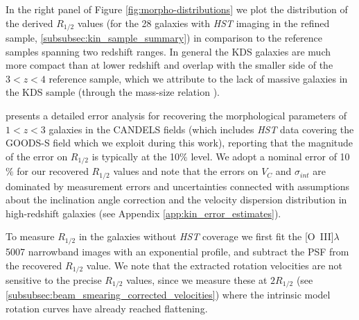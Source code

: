 \documentclass[fleqn,usenatbib]{mn2e}
\begin{document}
In the right panel of Figure \ref{fig:morpho-distributions} we plot the distribution of the derived $R_{1/2}$ values (for the 28 galaxies with {\em HST} imaging in the refined sample, \cref{subsubsec:kin_sample_summary}) in comparison to the reference samples spanning two redshift ranges.
In general the KDS galaxies are much more compact than at lower redshift and overlap with the smaller side of the $3 < z < 4$ reference sample, which we attribute to the lack of massive galaxies in the KDS sample (through the mass-size relation \citep[e.g.][]{Trujillo2004}).

\cite{Bruce2012} presents a detailed error analysis for recovering the morphological parameters of $1 < z < 3$ galaxies in the CANDELS fields (which includes {\em HST} data covering the GOODS-S field which we exploit during this work), reporting that the magnitude of the error on $R_{1/2}$ is typically at the 10$\%$ level.
We adopt a nominal error of 10$\%$ for our recovered $R_{1/2}$ values and note that the errors on $V_{C}$ and $\sigma_{int}$ are dominated by measurement errors and uncertainties connected with assumptions about the inclination angle correction and the velocity dispersion distribution in high-redshift galaxies (see Appendix \ref{app:kin_error_estimates}).

To measure $R_{1/2}$ in the galaxies without {\em HST} coverage we first fit the [O~{\sc III}]$\lambda$5007 narrowband images with an exponential profile, and subtract the PSF from the recovered $R_{1/2}$ value.
We note that the extracted rotation velocities are not sensitive to the precise $R_{1/2}$ values, since we measure these at $2R_{1/2}$ (see \cref{subsubsec:beam_smearing_corrected_velocities}) where the intrinsic model rotation curves have already reached flattening. \\
\end{document}
